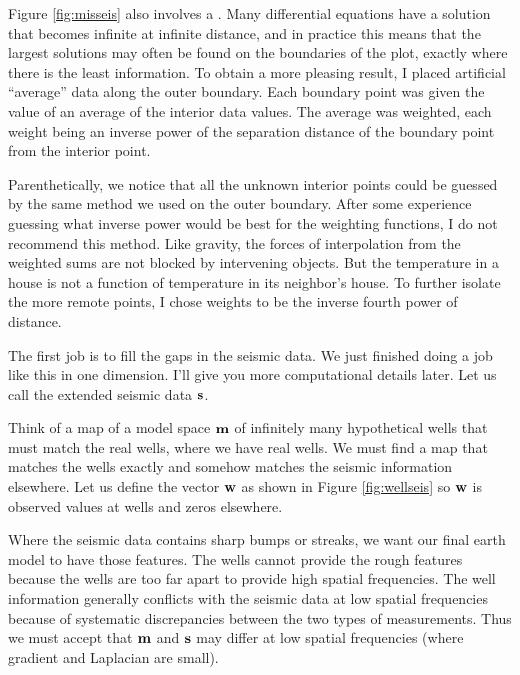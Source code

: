 \par
Figure \ref{fig:misseis} also involves a .
Many differential equations have a solution that becomes infinite
at infinite distance, and in practice this means that the largest
solutions may often be found on the boundaries of the plot,
exactly where there is the least information.
To obtain a more pleasing result,
I placed artificial ``average'' data
along the outer boundary.
Each boundary point was given the value of an average
of the interior data values.
The average was weighted,
each weight being an inverse power of the separation distance
of the boundary point from the interior point.

\par
Parenthetically, we notice that all the unknown interior points
could be guessed by the same method we used on the outer boundary.
After some experience guessing what inverse power would
be best for the weighting functions, I do not recommend this method.
Like gravity, the forces of interpolation from the weighted sums
are not blocked by intervening objects.
But the temperature in a house is not a function of temperature
in its neighbor's house.
To further isolate the more remote points,
I chose weights to be the inverse fourth power of distance.

\par
The first job is to fill the gaps in the seismic data.
We just finished doing a job like this in one dimension.
I'll give you more computational details later.
Let us call the extended seismic data  $\bold s$.

\par
Think of a map of a model space $\bold m$
of infinitely many hypothetical wells that must match the real wells,
where we have real wells.
We must find a map that matches the wells exactly
and somehow matches the seismic information elsewhere.
Let us define the vector $\bold w$ as shown in Figure \ref{fig:wellseis}
so $\bold w$ is
observed values at wells and zeros elsewhere.

\par
Where the seismic data contains sharp bumps or streaks,
we want our final earth model to have those features.
The wells cannot provide the rough features because the wells
are too far apart to provide high spatial frequencies.
The well information generally conflicts with the seismic data 
at low spatial frequencies because of systematic discrepancies between
the two types of measurements.
Thus we must accept that $\bold m$ and $\bold s$ may differ
at low spatial frequencies (where gradient and Laplacian are small).

